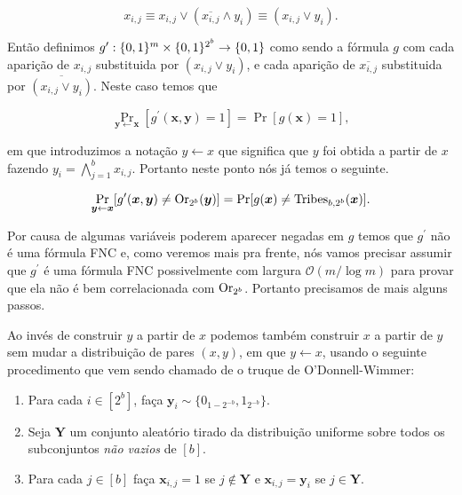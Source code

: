 \begin{equation*}
    x_{i, j} \equiv x_{i, j} \lor (\overline{x_{i, j}} \land y_{i}) \equiv (x_{i, j} \lor y_{i}).
\end{equation*}

Então definimos $g^{\prime}: \{0, 1\}^{m} \times \{0, 1\}^{2^{b}} \to \{0, 1\}$ como sendo a fórmula $g$ com cada aparição de $x_{i, j}$ substituida por $(x_{i, j} \lor y_{i})$, e cada aparição de $\overline{x_{i, j}}$ substituida por $\overline{(x_{i, j} \lor y_{i})}$. Neste caso temos que

\begin{equation*}
    \Pr_{ \boldsymbol{y} \leftarrow \boldsymbol{x}}[g^{\prime}(\boldsymbol{x}, \boldsymbol{y}) = 1] = \Pr[g(\boldsymbol{x}) = 1],
\end{equation*}

em que introduzimos a notação $y \leftarrow x$ que significa que $y$ foi obtida a partir de $x$ fazendo $y_{i} = \bigwedge_{j = 1}^{b} x_{i, j}$. Portanto neste ponto nós já temos o seguinte.

\begin{equation*} \label{correlation_equality}
    \Pr_{ \boldsymbol{y} \leftarrow \boldsymbol{x}}[g^{\prime}(\boldsymbol{x}, \boldsymbol{y}) \neq \text{Or}_{2^{b}}(\boldsymbol{y})] = \Pr[g(\boldsymbol{x}) \neq \text{Tribes}_{b, 2^{b}}(\boldsymbol{x})].
\end{equation*}

Por causa de algumas variáveis poderem aparecer negadas em $g$ temos que $g^{\prime}$ não é uma fórmula FNC e, como veremos mais pra frente, nós vamos precisar assumir que $g^{\prime}$ é uma fórmula FNC possivelmente com largura $\mathcal{O}(m/\log m)$ para provar que ela não é bem correlacionada com $\text{Or}_{2^{b}}$. Portanto precisamos de mais alguns passos.

Ao invés de construir $y$ a partir de $x$ podemos também construir $x$ a partir de $y$ sem mudar a distribuição de pares $(x, y)$, em que $y \leftarrow x$, usando o seguinte procedimento que vem sendo chamado de o truque de O'Donnell-Wimmer:

\begin{odonnell_wimmer} \leavevmode \label{odonnell_wimmer_trick}

    \begin{enumerate}

	    \item Para cada $i \in [2^{b}]$, faça $\boldsymbol{y}_{i} \sim \{0_{1 - 2^{-b}}, 1_{2^{-b}}\}$.
	
	    \item Seja $\boldsymbol{Y}$ um conjunto aleatório tirado da distribuição uniforme sobre todos os subconjuntos \emph{não vazios} de $[b]$.
	
	    \item Para cada $j \in [b]$ faça $\boldsymbol{x}_{i, j} = 1$ se $j \not\in \boldsymbol{Y}$ e $\boldsymbol{x}_{i, j} = \boldsymbol{y}_{i}$ se $j \in \boldsymbol{Y}$.
	
	\end{enumerate}

\end{odonnell_wimmer}

